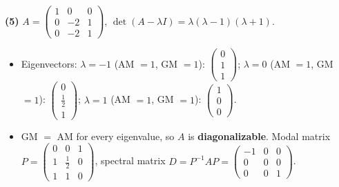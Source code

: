 \noindent\textbf{(5)} $A=\begin{pmatrix}1 & 0 & 0 \\ 0 & -2 & 1 \\ 0 & -2 & 1\end{pmatrix}$, $\det(A-\lambda I)=\lambda \left(\lambda - 1\right) \left(\lambda + 1\right)$.
\begin{itemize}\item Eigenvectors: $\lambda=-1$ (AM $=1$, GM $=1$): $\begin{pmatrix}0 \\ 1 \\ 1\end{pmatrix}$; $\lambda=0$ (AM $=1$, GM $=1$): $\begin{pmatrix}0 \\ \frac{1}{2} \\ 1\end{pmatrix}$; $\lambda=1$ (AM $=1$, GM $=1$): $\begin{pmatrix}1 \\ 0 \\ 0\end{pmatrix}$.
\item GM $=$ AM for every eigenvalue, so $A$ is \textbf{diagonalizable}. Modal matrix $P=\begin{pmatrix}0 & 0 & 1 \\ 1 & \frac{1}{2} & 0 \\ 1 & 1 & 0\end{pmatrix}$, spectral matrix $D=P^{-1}AP=\begin{pmatrix}-1 & 0 & 0 \\ 0 & 0 & 0 \\ 0 & 0 & 1\end{pmatrix}$.\end{itemize}

